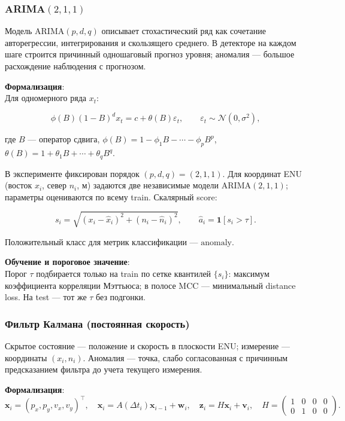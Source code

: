 \documentclass[a4paper,12pt]{report}
\begin{document}
	\subsubsection{ARIMA$(2,1,1)$}
	Модель ARIMA$(p,d,q)$ описывает стохастический ряд как сочетание авторегрессии, интегрирования и скользящего среднего. В детекторе на каждом шаге строится причинный одношаговый прогноз уровня; аномалия — большое расхождение наблюдения с прогнозом.

	\textbf{Формализация}:\\
	Для одномерного ряда $x_t$:

	$$
	\phi(B)(1-B)^d x_t = c + \theta(B)\varepsilon_t, \qquad \varepsilon_t \sim \mathcal N(0,\sigma^2),
	$$

	где $B$ — оператор сдвига, $\phi(B)=1-\phi_1 B-\cdots-\phi_p B^p$, $\theta(B)=1+\theta_1 B+\cdots+\theta_q B^q$.

	В эксперименте фиксирован порядок $(p,d,q)=(2,1,1)$. Для координат ENU (восток $x_i$, север $n_i$, м) задаются две независимые модели $\mathrm{ARIMA}(2,1,1)$; параметры оцениваются по всему train. Скалярный score:

	$$
	s_i = \sqrt{(x_i-\hat{x}_i)^2 + (n_i-\hat{n}_i)^2}, \qquad \hat a_i = \mathbf{1}[s_i > \tau].
	$$

	Положительный класс для метрик классификации — $\mathrm{anomaly}$.


	\textbf{Обучение и пороговое значение}:\\
	Порог $\tau$ подбирается только на train по сетке квантилей $\{s_i\}$: максимум коэффициента корреляции Мэттьюса; в полосе MCC — минимальный distance loss. На test — тот же $\tau$ без подгонки.

	\subsubsection{Фильтр Калмана (постоянная скорость)}
	Скрытое состояние — положение и скорость в плоскости ENU; измерение — координаты $(x_i, n_i)$. Аномалия — точка, слабо согласованная с причинным предсказанием фильтра до учета текущего измерения.

	\textbf{Формализация}:\\
	$$
	\mathbf{x}_i = (p_x, p_y, v_x, v_y)^\top, \quad \mathbf{x}_i = A(\Delta t_i)\mathbf{x}_{i-1} + \mathbf{w}_i, \quad \mathbf{z}_i = H\mathbf{x}_i + \mathbf{v}_i, \quad H=\begin{pmatrix}1&0&0&0\\0&1&0&0\end{pmatrix}.
	$$
\end{document}
